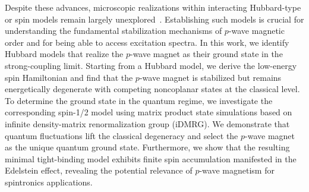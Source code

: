 \documentclass[aps,prl,twocolumn,showpacs,superscriptaddress]{revtex4-2}
\begin{document}
Despite these advances, microscopic realizations within interacting Hubbard-type or spin models remain largely unexplored~\cite{lee2025inversion,ntsh-ypmc}. Establishing such models is crucial for understanding the fundamental stabilization mechanisms of $p$-wave magnetic order and for being able to access excitation spectra. In this work, we identify Hubbard models that realize the $p$-wave magnet as their ground state in the strong-coupling limit. Starting from a Hubbard model, we derive the low-energy spin Hamiltonian and find that the $p$-wave magnet is stabilized but remains energetically degenerate with competing noncoplanar states at the classical level. To determine the ground state in the quantum regime, we investigate the corresponding spin-1/2 model using matrix product state simulations based on infinite density-matrix renormalization group (iDMRG). We demonstrate that quantum fluctuations lift the classical degeneracy and select the $p$-wave magnet as the unique quantum ground state. Furthermore, we show that the resulting minimal tight-binding model exhibits finite spin accumulation manifested in the Edelstein effect, revealing the potential relevance of $p$-wave magnetism for spintronics applications.
\end{document}
